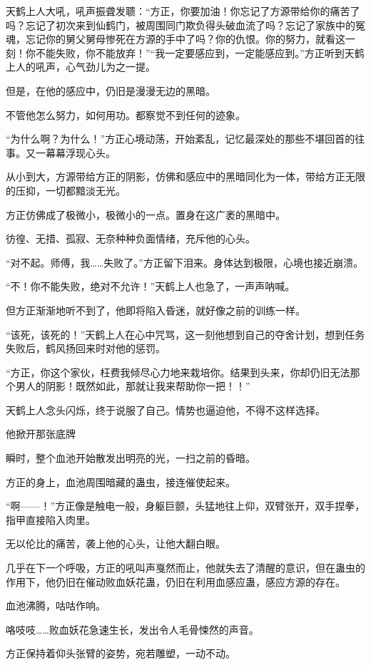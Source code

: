 \begin{this_body}
天鹤上人大吼，吼声振聋发聩：“方正，你要加油！你忘记了方源带给你的痛苦了吗？忘记了初次来到仙鹤门，被周围同门欺负得头破血流了吗？忘记了家族中的冤魂，忘记你的舅父舅母惨死在方源的手中了吗？你的仇恨。你的努力，就看这一刻！你不能失败，你不能放弃！”“我一定要感应到，一定能感应到。”方正听到天鹤上人的吼声，心气劲儿为之一提。

但是，在他的感应中，仍旧是漫漫无边的黑暗。

不管他怎么努力，如何用功。都察觉不到任何的迹象。

“为什么啊？为什么！”方正心境动荡，开始紊乱，记忆最深处的那些不堪回首的往事。又一幕幕浮现心头。

从小到大，方源带给方正的阴影，仿佛和感应中的黑暗同化为一体，带给方正无限的压抑，一切都黯淡无光。

方正仿佛成了极微小，极微小的一点。置身在这广袤的黑暗中。

彷徨、无措、孤寂、无奈种种负面情绪，充斥他的心头。

“对不起。师傅，我……失败了。”方正留下泪来。身体达到极限，心境也接近崩溃。

“不！你不能失败，绝对不允许！”天鹤上人也急了，一声声呐喊。

但方正渐渐地听不到了，他即将陷入昏迷，就好像之前的训练一样。

“该死，该死的！”天鹤上人在心中咒骂，这一刻他想到自己的夺舍计划，想到任务失败后，鹤风扬回来时对他的惩罚。

“方正，你这个家伙，枉费我倾尽心力地来栽培你。结果到头来，你却仍旧无法那个男人的阴影！既然如此，那就让我来帮助你一把！！”

天鹤上人念头闪烁，终于说服了自己。情势也逼迫他，不得不这样选择。

他掀开那张底牌

瞬时，整个血池开始散发出明亮的光，一扫之前的昏暗。

方正的身上，血池周围暗藏的蛊虫，接连催使起来。

“啊——！”方正像是触电一般，身躯巨颤，头猛地往上仰，双臂张开，双手捏拳，指甲直接陷入肉里。

无以伦比的痛苦，袭上他的心头，让他大翻白眼。

几乎在下一个呼吸，方正的吼叫声戛然而止，他就失去了清醒的意识，但在蛊虫的作用下，他仍旧在催动败血妖花蛊，仍旧在利用血感应蛊，感应方源的存在。

血池沸腾，咕咕作响。

咯吱吱……败血妖花急速生长，发出令人毛骨悚然的声音。

方正保持着仰头张臂的姿势，宛若雕塑，一动不动。


\end{this_body}
